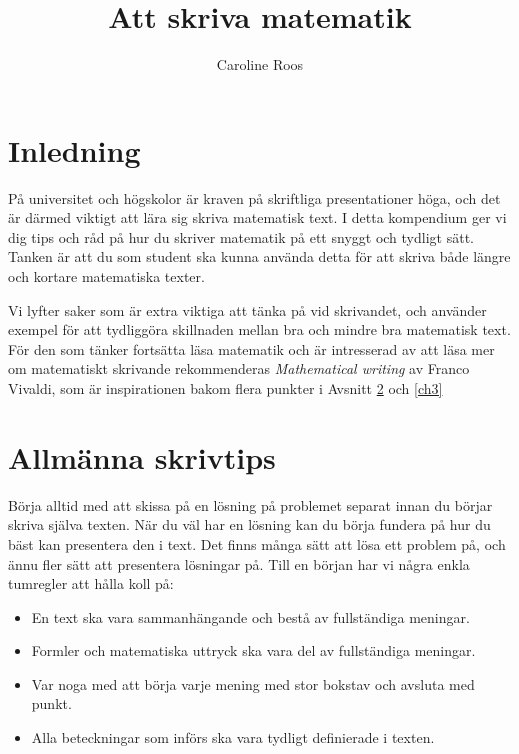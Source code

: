 \documentclass[titlepage]{article}
\title{Att skriva matematik}
\author{Caroline Roos}
\date{}
\begin{document}
\begin{titlepage}
    \maketitle
\end{titlepage}

\tableofcontents
\thispagestyle{empty}



\newpage
\setcounter{page}{1}

\section{Inledning}

På universitet och högskolor är kraven på skriftliga presentationer höga, och det är därmed viktigt att lära sig skriva matematisk text. I detta kompendium ger vi dig tips och råd på hur du skriver matematik på ett snyggt och tydligt sätt. Tanken är att du som student ska kunna använda detta för att skriva både längre och kortare matematiska texter.

Vi lyfter saker som är extra viktiga att tänka på vid skrivandet, och använder exempel för att tydliggöra skillnaden mellan bra och mindre bra matematisk text. För den som tänker fortsätta läsa matematik och är intresserad av att läsa mer om matematiskt skrivande rekommenderas \textit{Mathematical writing} av Franco Vivaldi\cite{vivaldi}, som är inspirationen bakom flera punkter i Avsnitt \ref{ch2} och \ref{ch3}



\section{Allmänna skrivtips}\label{ch2}

Börja alltid med att skissa på en lösning på problemet separat innan du börjar skriva själva texten. När du väl har en lösning kan du börja fundera på hur du bäst kan presentera den i text. Det finns många sätt att lösa ett problem på, och ännu fler sätt att presentera lösningar på. Till en början har vi några enkla tumregler att hålla koll på:

\begin{itemize}
    \item En text ska vara sammanhängande och bestå av fullständiga meningar.
    \item Formler och matematiska uttryck ska vara del av fullständiga meningar.
    \item Var noga med att börja varje mening med stor bokstav och avsluta med punkt.
    \item Alla beteckningar som införs ska vara tydligt definierade i texten.
\end{itemize}
\end{document}
